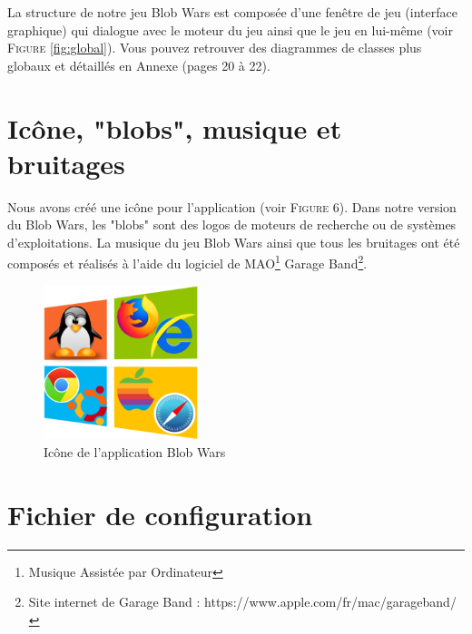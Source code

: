 \documentclass[11pt,a4paper]{article}
\begin{document}
La structure de notre jeu Blob Wars est composée d'une fenêtre de jeu (interface graphique) qui dialogue avec le moteur du jeu ainsi que le jeu en lui-même (voir \textsc{Figure} \ref{fig:global}). Vous pouvez retrouver des diagrammes de classes plus globaux et détaillés en Annexe (pages 20 à 22).

\section{Icône, "blobs", musique et bruitages}

Nous avons créé une icône pour l'application (voir \textsc{Figure} 6). Dans notre version du Blob Wars, les "blobs" sont des logos de moteurs de recherche ou de systèmes d'exploitations. La musique du jeu Blob Wars ainsi que tous les bruitages ont été composés et réalisés à l'aide du logiciel de MAO\footnote{Musique Assistée par Ordinateur} Garage Band\footnote{Site internet de Garage Band : https://www.apple.com/fr/mac/garageband/}.

\vspace{10px}

\begin{figure}[h]
\begin{center}
\includegraphics[width=0.4\textwidth]{figures/icone.png}
\caption{Icône de l'application Blob Wars}
\end{center}
\end{figure}

\newpage

\section{Fichier de configuration}
\end{document}
